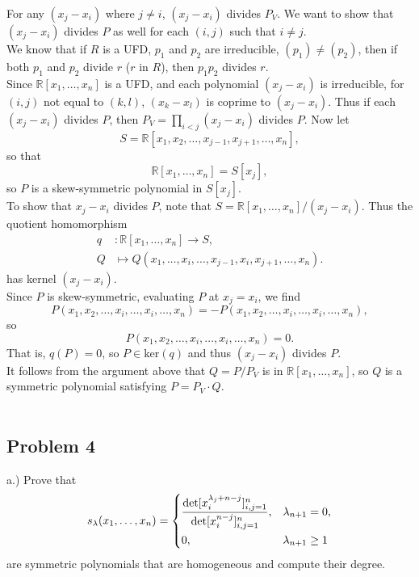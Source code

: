 \documentclass[12pt]{article}
\begin{document}
For any $(x_j - x_i)$ where $j \neq i$, $(x_j - x_i)$ divides $P_V$. 
We want to show that $(x_j - x_i)$ divides $P$ as well for each $(i,j)$ such that $i \neq j$.\\

We know that if $R$ is a UFD, $p_1$ and $p_2$ are irreducible, $(p_1) \neq (p_2)$, then if both $p_1$ and $p_2$ divide $r$ ($r$ in $R$), then $p_1p_2$ divides $r$.\\

Since $\mathbb{R}[x_1, \dots, x_n]$ is a UFD, and each polynomial $(x_j - x_i)$ is irreducible, for $(i, j)$ not equal to $(k, l)$, 
$(x_k - x_l)$ is coprime to $(x_j -x_i)$. Thus if each $(x_j-x_i)$ divides $P$, then $P_V = \prod_{i < j} (x_j - x_i)$ divides $P$. Now let
$$S = \mathbb{R}[x_1, x_2, \dots, x_{j-1}, x_{j+1} , \dots, x_n],$$
so that
$$\mathbb{R}[x_1, \dots, x_n] = S[x_j],$$
so $P$ is a skew-symmetric polynomial in $S[x_j]$.\\

To show that $x_j-x_i$ divides $P$, note that $S = \mathbb{R}[x_1,\dots,x_n]/(x_j-x_i)$. Thus the quotient homomorphism 
\begin{align*}
q &: \mathbb{R}[x_1,\dots,x_n] \longrightarrow S,\\
Q &\mapsto Q(x_1,\dots,x_i,\dots,x_{j-1},x_i,x_{j+1},\dots,x_n).
\end{align*}
has kernel $(x_j - x_i)$.\\

Since $P$ is skew-symmetric, evaluating $P$ at $x_j = x_i$, we find
$$P (x_1, x_2, \dots, x_i, \dots , x_i, \dots, x_n) 
= -P(x_1, x_2, \dots, x_i, \dots, x_i, \dots, x_n),$$
so
$$P(x_1, x_2, \dots, x_i, \dots, x_i, \dots, x_n) =  0.$$
That is, $q(P) = 0$, so $P\in \mathrm{ker}(q)$ and thus $(x_j - x_i)$  divides $P$.\\

It follows from the argument above that $Q = P/P_V$ is in $\mathbb{R}[x_1,\dots,x_n]$, so $Q$ is a symmetric polynomial satisfying $P = P_V\cdot Q$.\\\\

	\subsection*{Problem 4}

a.) Prove that 
\[
s_\lambda(x_1,\dots,x_n) = \begin{dcases}
\frac{\det [x_i^{\lambda_j+n-j}]_{i,j=1}^n}{\det [x_i^{n-j}]_{i,j=1}^n}, & \lambda_{n+1}=0,\\
0, & \lambda_{n+1}\geq 1
\end{dcases}
\]
are symmetric polynomials that are homogeneous and compute their degree.\\ 
\end{document}

